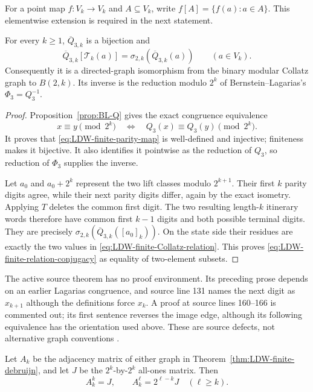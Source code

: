 For a point map $f:V_k\to V_k$ and $A\subseteq V_k$, write
$f[A]=\{f(a):a\in A\}$.  This elementwise extension is required in the next
statement.

\begin{theorem}
\label{thm:LDW-finite-debruijn}
For every $k\geq1$, $\overline Q_{3,k}$ is a bijection and
\begin{equation}
\label{eq:LDW-finite-relation-conjugacy}
 \overline Q_{3,k}[\mathcal T_k(a)]
 =\sigma_{2,k}(\overline Q_{3,k}(a))
 \qquad(a\in V_k).
\end{equation}
Consequently it is a directed-graph isomorphism from the binary modular
Collatz graph to $B(2,k)$.  Its inverse is the reduction modulo $2^k$ of
Bernstein--Lagarias's $\Phi_3=Q_3^{-1}$.
\end{theorem}

\begin{proof}
Proposition~\ref{prop:BL-Q} gives the exact congruence equivalence
\[
 x\equiv y\pmod{2^k}
 \quad\Longleftrightarrow\quad
 Q_3(x)\equiv Q_3(y)\pmod{2^k}.
\]
It proves that \eqref{eq:LDW-finite-parity-map} is well-defined and injective;
finiteness makes it bijective.  It also identifies it pointwise as the
reduction of $Q_3$, so reduction of $\Phi_3$ supplies the inverse.

Let $a_0$ and $a_0+2^k$ represent the two lift classes modulo $2^{k+1}$.
Their first $k$ parity digits agree, while their next parity digits differ,
again by the exact isometry.  Applying $T$ deletes the common first digit.
The two resulting length-$k$ itinerary words therefore have common first
$k-1$ digits and both possible terminal digits.  They are precisely
$\sigma_{2,k}(\overline Q_{3,k}([a_0]_k))$.  On the state side their residues
are exactly the two values in
\eqref{eq:LDW-finite-Collatz-relation}.  This proves
\eqref{eq:LDW-finite-relation-conjugacy} as equality of two-element subsets.
\end{proof}

The active source theorem has no proof environment.  Its preceding prose
depends on an earlier Lagarias congruence, and source line 131 names the next
digit as $x_{k+1}$ although the definitions force $x_k$.  A proof at source
lines 160--166 is commented out; its first sentence reverses the image edge,
although its following equivalence has the orientation used above.  These are
source defects, not alternative graph conventions
\cite[Sec.~2]{LaarhovenDeWeger2012}.

\begin{proposition}
\label{prop:LDW-path-counts}
Let $A_k$ be the adjacency matrix of either graph in
Theorem~\ref{thm:LDW-finite-debruijn}, and let $J$ be the $2^k$-by-$2^k$
all-ones matrix.  Then
\begin{equation}
\label{eq:LDW-path-counts}
 A_k^k=J,
 \qquad
 A_k^\ell=2^{\ell-k}J\quad(\ell\geq k).
\end{equation}
\end{proposition}

